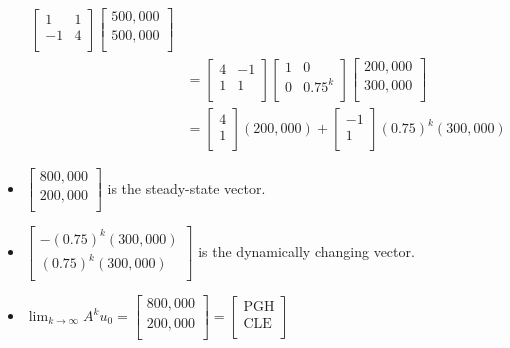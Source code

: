 \documentclass{article}
\begin{document}
\begin{itemize}
\begin{align*}
        \begin{bmatrix}
            1 & 1\\
            -1 & 4\\
        \end{bmatrix}
        \begin{bmatrix}
            500,000\\
            500,000\\
        \end{bmatrix}\\
        &=
        \begin{bmatrix}
            4 & -1\\
            1 & 1\\
        \end{bmatrix}
        \begin{bmatrix}
            1 & 0\\
            0 & 0.75^k\\
        \end{bmatrix}
        \begin{bmatrix}
            200,000\\
            300,000\\
        \end{bmatrix}\\
        &=
        \begin{bmatrix}
            4\\
            1\\
        \end{bmatrix}
        (200,000) +
        \begin{bmatrix}
            -1\\
            1\\
        \end{bmatrix}
        (0.75)^k(300,000)
    \end{align*}
    \item $
        \begin{bmatrix}
            800,000\\
            200,000\\
        \end{bmatrix}
    $ is the steady-state vector.
    \item $
        \begin{bmatrix}
            -(0.75)^k(300,000)\\
            (0.75)^k(300,000)\\
        \end{bmatrix}
    $ is the dynamically changing vector.
    \item $
        \lim_{k\to\infty} A^ku_0 =
        \begin{bmatrix}
            800,000\\
            200,000\\
        \end{bmatrix}
        =
        \begin{bmatrix}
            \text{PGH}\\
            \text{CLE}\\
        \end{bmatrix}
    $
\end{itemize}
\end{document}
